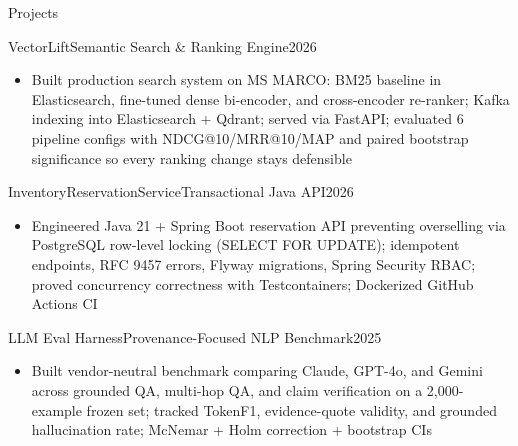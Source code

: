 \documentclass{mcdowellcv}
\begin{document}
\begin{cvsection}{Projects}

  \begin{cvsubsection}{VectorLift}{Semantic Search \& Ranking Engine}{2026}
    \begin{itemize}
      \item Built production search system on MS MARCO: BM25 baseline in Elasticsearch, fine-tuned dense bi-encoder, and cross-encoder re-ranker; Kafka indexing into Elasticsearch + Qdrant; served via FastAPI; evaluated 6 pipeline configs with NDCG@10/MRR@10/MAP and paired bootstrap significance so every ranking change stays defensible
    \end{itemize}
  \end{cvsubsection}

  \begin{cvsubsection}{InventoryReservationService}{Transactional Java API}{2026}
    \begin{itemize}
      \item Engineered Java 21 + Spring Boot reservation API preventing overselling via PostgreSQL row-level locking (SELECT FOR UPDATE); idempotent endpoints, RFC 9457 errors, Flyway migrations, Spring Security RBAC; proved concurrency correctness with Testcontainers; Dockerized GitHub Actions CI
    \end{itemize}
  \end{cvsubsection}

  \begin{cvsubsection}{LLM Eval Harness}{Provenance-Focused NLP Benchmark}{2025}
    \begin{itemize}
      \item Built vendor-neutral benchmark comparing Claude, GPT-4o, and Gemini across grounded QA, multi-hop QA, and claim verification on a 2,000-example frozen set; tracked TokenF1, evidence-quote validity, and grounded hallucination rate; McNemar + Holm correction + bootstrap CIs
    \end{itemize}
  \end{cvsubsection}

\end{cvsection}
\end{document}
